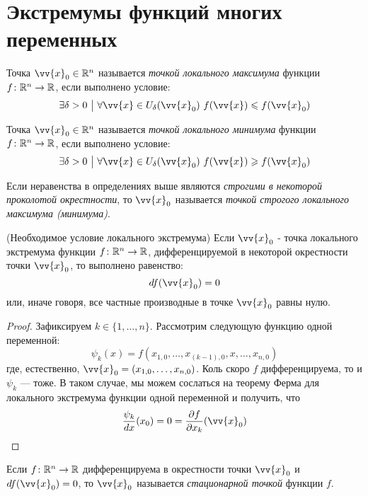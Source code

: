 \section{Экстремумы функций многих переменных}

\begin{definition}
	Точка $\vv{x}_0 \in \R^n$ называется \textit{точкой локального максимума} функции $f \colon \mathbb{R}^n \to \mathbb{R}$, если выполнено условие:
	\[
		\exists \delta > 0 \such \forall \vv{x} \in U_\delta(\vv{x}_0)\ f(\vv{x}) \le f(\vv{x}_0)
	\]
\end{definition}

\begin{definition}
	Точка $\vv{x}_0 \in \R^n$ называется \textit{точкой локального минимума} функции $f \colon \mathbb{R}^n \to \mathbb{R}$, если выполнено условие:
	\[
	\exists \delta > 0 \such \forall \vv{x} \in U_\delta(\vv{x}_0)\ f(\vv{x}) \ge f(\vv{x}_0)
	\]
\end{definition}

\begin{note}
	Если неравенства в определениях выше являются \textit{строгими в некоторой проколотой окрестности}, то $\vv{x}_0$ называется \textit{точкой строгого локального максимума (минимума)}.
\end{note}

\begin{theorem} (Необходимое условие локального экстремума)
	Если $\vv{x}_0$ - точка локального экстремума функции $f \colon \mathbb{R}^n \to \mathbb{R}$, дифференцируемой в некоторой окрестности точки $\vv{x}_0$, то выполнено равенство:
	\[
		df(\vv{x}_0) = 0
	\]
	или, иначе говоря, все частные производные в точке $\vv{x}_0$ равны нулю.
\end{theorem}

\begin{proof}
	Зафиксируем $k \in \{1, \ldots, n\}$. Рассмотрим следующую функцию одной переменной:
	\[
		\psi_k(x) = f(x_{1, 0}, \ldots, x_{(k - 1), 0}, x, \ldots, x_{n, 0})
	\]
	где, естественно, $\vv{x}_0 = (x_{1, 0}, \ldots, x_{n, 0})$. Коль скоро $f$ дифференцируема, то и $\psi_k$ --- тоже. В таком случае, мы можем сослаться на теорему Ферма для локального экстремума функции одной переменной и получить, что
	\[
		\frac{\psi_k}{dx}(x_0) = 0 = \pd{f}{x_k}(\vv{x}_0)
	\]
\end{proof}

\begin{definition}
	Если $f \colon \mathbb{R}^n \to \mathbb{R}$ дифференцируема в окрестности точки $\vv{x}_0$ и $df(\vv{x}_0) = 0$, то $\vv{x}_0$ называется \textit{стационарной точкой} функции $f$.
\end{definition}

